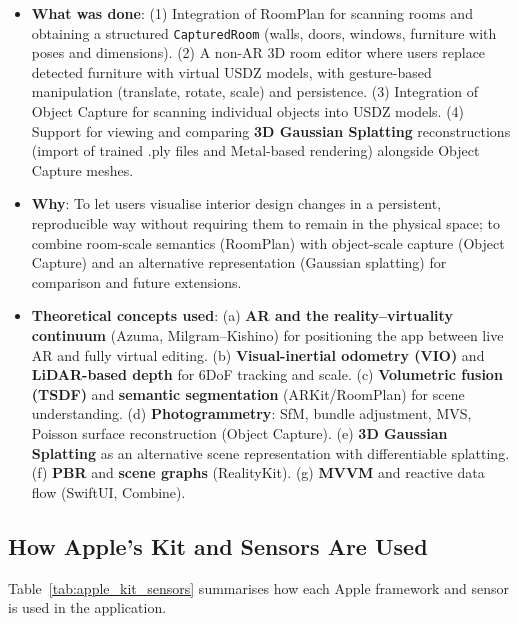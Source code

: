 \begin{itemize}
    \item \textbf{What was done}: (1) Integration of RoomPlan for scanning rooms and obtaining a structured \texttt{CapturedRoom} (walls, doors, windows, furniture with poses and dimensions). (2) A non-AR 3D room editor where users replace detected furniture with virtual USDZ models, with gesture-based manipulation (translate, rotate, scale) and persistence. (3) Integration of Object Capture for scanning individual objects into USDZ models. (4) Support for viewing and comparing \textbf{3D Gaussian Splatting} reconstructions (import of trained .ply files and Metal-based rendering) alongside Object Capture meshes.
    \item \textbf{Why}: To let users visualise interior design changes in a persistent, reproducible way without requiring them to remain in the physical space; to combine room-scale semantics (RoomPlan) with object-scale capture (Object Capture) and an alternative representation (Gaussian splatting) for comparison and future extensions.
    \item \textbf{Theoretical concepts used}: (a) \textbf{AR and the reality--virtuality continuum} (Azuma, Milgram--Kishino) for positioning the app between live AR and fully virtual editing. (b) \textbf{Visual-inertial odometry (VIO)} and \textbf{LiDAR-based depth} for 6DoF tracking and scale. (c) \textbf{Volumetric fusion (TSDF)} and \textbf{semantic segmentation} (ARKit/RoomPlan) for scene understanding. (d) \textbf{Photogrammetry}: SfM, bundle adjustment, MVS, Poisson surface reconstruction (Object Capture). (e) \textbf{3D Gaussian Splatting} as an alternative scene representation with differentiable splatting. (f) \textbf{PBR} and \textbf{scene graphs} (RealityKit). (g) \textbf{MVVM} and reactive data flow (SwiftUI, Combine).
\end{itemize}

\subsection{How Apple's Kit and Sensors Are Used}
\label{sec:apple_kit_sensors}

Table~\ref{tab:apple_kit_sensors} summarises how each Apple framework and sensor is used in the application.

